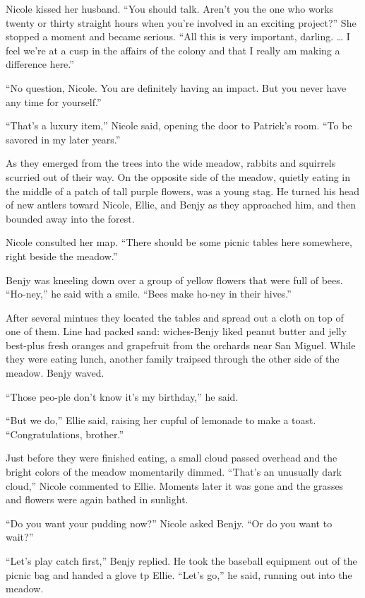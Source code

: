 \documentclass[]{article}
\begin{document}
{Nicole kissed her husband. “You should talk. Aren’t you the one who works twenty or thirty straight hours when you’re involved in an exciting project?” She stopped a moment and became serious. “All this is very important, darling. … I feel we’re at a cusp in the affairs of the colony and that I really am making a difference here.”

“No question, Nicole. You are definitely having an impact. But you never have any time for yourself.”

“That’s a luxury item,” Nicole said, opening the door to Patrick’s room. “To be savored in my later years.”

As they emerged from the trees into the wide meadow, rabbits and squirrels scurried out of their way. On the opposite side of the meadow, quietly eating in the middle of a patch of tall purple flowers, was a young stag. He turned his head of new antlers toward Nicole, Ellie, and Benjy as they approached him, and then bounded away into the forest.

Nicole consulted her map. “There should be some picnic tables here somewhere, right beside the meadow.”

Benjy was kneeling down over a group of yellow flowers that were full of bees. “Ho-ney,” he said with a smile. “Bees make ho-ney in their hives.”

After several mintues they located the tables and spread out a cloth on top of one of them. Line had packed sand: wiches-Benjy liked peanut butter and jelly best-plus fresh oranges and grapefruit from the orchards near San Miguel. While they were eating lunch, another family traipsed through the other side of the meadow. Benjy waved.

“Those peo-ple don’t know it’s my birthday,” he said.

“But we do,” Ellie said, raising her cupful of lemonade to make a toast. “Congratulations, brother.”

Just before they were finished eating, a small cloud passed overhead and the bright colors of the meadow momentarily dimmed. “That’s an unusually dark cloud,” Nicole commented to Ellie. Moments later it was gone and the grasses and flowers were again bathed in sunlight.

“Do you want your pudding now?” Nicole asked Benjy. “Or do you want to wait?”

“Let’s play catch first,” Benjy replied. He took the baseball equipment out of the picnic bag and handed a glove tp Ellie. “Let’s go,” he said, running out into the meadow.

}
\end{document}
